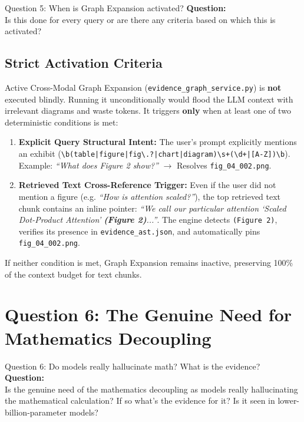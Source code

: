\documentclass[11pt,a4paper]{article}
\begin{document}
\begin{questionbox}{Question 5: When is Graph Expansion activated?}
\textbf{Question:}\\
Is this done for every query or are there any criteria based on which this is activated?
\end{questionbox}

\subsection{Strict Activation Criteria}
Active Cross-Modal Graph Expansion (\texttt{evidence\_graph\_service.py}) is \textbf{not} executed blindly. Running it unconditionally would flood the LLM context with irrelevant diagrams and waste tokens. It triggers \textbf{only} when at least one of two deterministic conditions is met:

\begin{enumerate}
    \item \textbf{Explicit Query Structural Intent:} The user's prompt explicitly mentions an exhibit (\texttt{\textbackslash b(table|figure|fig\textbackslash.?|chart|diagram)\textbackslash s+(\textbackslash d+|[A-Z])\textbackslash b}). Example: \textit{``What does Figure 2 show?''} $\to$ Resolves \texttt{fig\_04\_002.png}.
    \item \textbf{Retrieved Text Cross-Reference Trigger:} Even if the user did not mention a figure (e.g. \textit{``How is attention scaled?''}), the top retrieved text chunk contains an inline pointer: \textit{``We call our particular attention `Scaled Dot-Product Attention' \textbf{(Figure 2)}...''}. The engine detects \texttt{(Figure 2)}, verifies its presence in \texttt{evidence\_ast.json}, and automatically pins \texttt{fig\_04\_002.png}.
\end{enumerate}
If neither condition is met, Graph Expansion remains inactive, preserving 100\% of the context budget for text chunks.

\vspace{1em}

\section{Question 6: The Genuine Need for Mathematics Decoupling}

\begin{questionbox}{Question 6: Do models really hallucinate math? What is the evidence?}
\textbf{Question:}\\
Is the genuine need of the mathematics decoupling as models really hallucinating the mathematical calculation? If so what's the evidence for it? Is it seen in lower-billion-parameter models?
\end{questionbox}
\end{document}
